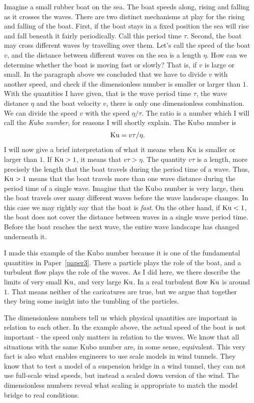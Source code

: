 \documentclass[thesis.tex]{subfiles}
\begin{document}
Imagine a small rubber boat on the sea. The boat speeds along, rising and falling as it crosses the waves. There are two distinct mechanisms at play for the rising and falling of the boat. First, if the boat stays in a fixed position the sea will rise and fall beneath it fairly periodically. Call this period time $\tau$. Second, the boat may cross different waves by travelling over them. Let's call the speed of the boat $v$, and the distance between different waves on the sea is a length $\eta$. How can we determine whether the boat is moving fast or slowly? That is, if $v$ is large or small. In the paragraph above we concluded that we have to divide $v$ with another speed, and check if the dimensionless number is smaller or larger than $1$. With the quantities I have given, that is the wave period time $\tau$, the wave distance $\eta$ and the boat velocity $v$, there is only one dimensionless combination. We can divide the speed $v$ with the speed $\eta/\tau$. The ratio is a number which I will call the \emph{Kubo number}, for reasons I will shortly explain. The Kubo number is
\begin{align*}
\mbox{Ku} = v\tau/\eta.
\end{align*}
I will now give a brief interpretation of what it means when $\mbox{Ku}$ is smaller or larger than $1$. If $\mbox{Ku} > 1$, it means that $v\tau > \eta$. The quantity $v\tau$ is a length, more precisely the length that the boat travels during the period time of a wave. Thus, $\mbox{Ku} > 1$ means that the boat travels more than one wave distance during the period time of a single wave. Imagine that the Kubo number is very large, then the boat travels over many different waves before the wave landscape changes. In this case we may rightly say that the boat is \emph{fast}. On the other hand, if $\mbox{Ku}<1$, the boat does not cover the distance between waves in a single wave period time. Before the boat reaches the next wave, the entire wave landscape has changed underneath it.

I made this example of the Kubo number because it is one of the fundamental quantities in Paper~\ref{paper3}. There a particle plays the role of the boat, and a turbulent flow plays the role of the waves. As I did here, we there describe the limits of very small $\mbox{Ku}$, and very large $\mbox{Ku}$. In a real turbulent flow $\mbox{Ku}$ is around $1$. That means neither of the caricatures are true, but we argue that together they bring some insight into the tumbling of the particles.

The dimensionless numbers tell us which physical quantities are important in relation to each other. In the example above, the actual speed of the boat is not important - the speed only matters in relation to the waves. We know that all situations with the same Kubo number are, in some sense, equivalent. This very fact is also what enables engineers to use scale models in wind tunnels. They know that to test a model of a suspension bridge in a wind tunnel, they can not use full-scale wind speeds, but instead a scaled down version of the wind. The dimensionless numbers reveal what scaling is appropriate to match the model bridge to real conditions.
\end{document}
